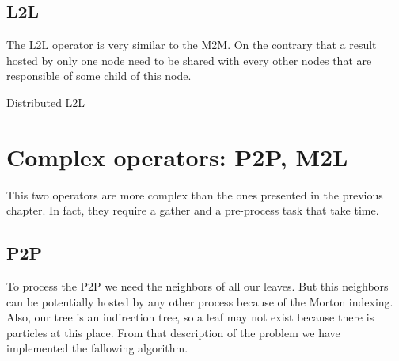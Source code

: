 \documentclass[10pt,letterpaper,titlepage]{report}
\begin{document}

\section{L2L}
The L2L operator is very similar to the M2M.
On the contrary that a result hosted by only one node need to be shared with every other nodes that are responsible of some child of this node.

\begin{algorithm}[H]
\SetLine
{}
\BlankLine
{}
\BlankLine
\caption{Distributed L2L}
\end{algorithm}


\chapter{Complex operators: P2P, M2L}
This two operators are more complex than the ones presented in the previous chapter.
In fact, they require a gather and a pre-process task that take time.

\section{P2P}
To process the P2P we need the neighbors of all our leaves.
But this neighbors can be potentially hosted by any other process because of the Morton indexing.
Also, our tree is an indirection tree, so a leaf may not exist because there is particles at this place.
From that description of the problem we have implemented the fallowing algorithm.
\end{document}
